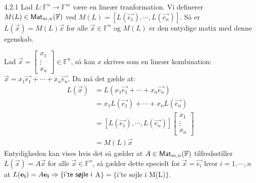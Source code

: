 \begin{saetning}{4.2.1}
	Lad $L: \mathbb{F}^n \rightarrow \mathbb{F}^m$ være en lineær tranformation.	
	Vi definerer $M(L) \in \textsf{Mat}_{m,n}(\mathbb{F})$ ved $M(L) = [L(\vec{e_1}), 
	\cdots, L(\vec{e_n})]$.
	Så er $L(\vec{x}) = M(L)\vec{x}$ for alle $\vec{x} \in \mathbb{F}^n$ og 
	$M(L)$ er den entydige matix med denne egenskab.
\end{saetning}

\begin{bevis}
	Lad $\vec{x} = \begin{bmatrix}x_1\\ \vdots \\ x_n\end{bmatrix} \in 
	\mathbb{F}^n$, så kan $x$ skrives som en lineær kombination: $\vec{x} = 
	x_1\vec{e_1} + \cdots + x_n\vec{e_n}$. Da må det gælde at:
	\begin{align*}	
		L(\vec{x}) &= L(x_1\vec{e_1} + \cdots + x_n\vec{e_n}) \\
				   &= x_1L(\vec{e_1}) + \cdots + x_nL(\vec{e_n}) \\
				   &= [L(\vec{e_1}), \cdots, L(\vec{e_n})]
					\begin{bmatrix}
						x_1 \\
						\vdots \\
						x_n
					\end{bmatrix} \\
				   &= M(L)\vec{x}
	\end{align*}
	Entydigheden kan vises hvis det så gælder at $A \in \textsf{Mat}_{m,n}(\mathbb{F})$ 
	tilfredsstiller $L(\vec{x}) = A\vec{x}$ for alle $\vec{x} \in 
	\mathbb{F}^n$, så gælder dette specielt for $\vec{x} = \vec{e_i}$ hvor
	$i = 1, \cdots, n$ at $L(\mathbf{e_i}) = A\mathbf{e_i} \Rightarrow \{\textsf{i'te søjle i } 
	$A$\} = \{\text{i'te søjle i }$M(L)$\}$.
\end{bevis}
